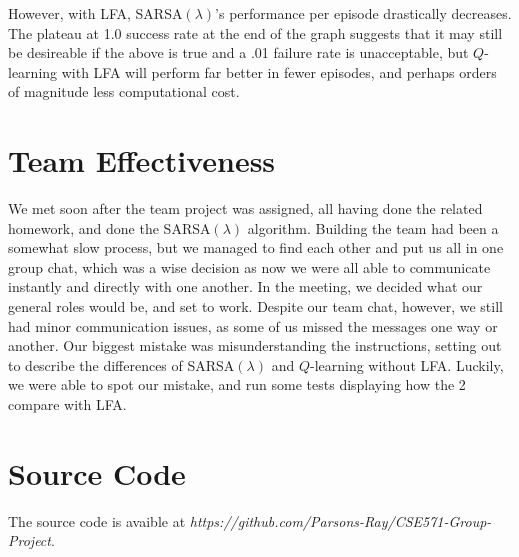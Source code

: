 \documentclass[10pt,conference]{IEEEtran}
\begin{document}
However, with LFA, SARSA\((\lambda)\)'s performance per episode drastically 
decreases. The plateau at 1.0 success rate at the end of the graph suggests that 
it may still be desireable if the above is true and a .01 failure rate is unacceptable, 
but \(Q\)-learning with LFA will perform far better in fewer episodes, and perhaps orders of magnitude less computational cost.


\section{Team Effectiveness}
\label{sec:team}
We met soon after the team project was assigned, all having done the 
related homework, and done the SARSA\((\lambda)\) algorithm. Building 
the team had been a somewhat slow process, but we managed to find each 
other and put us all in one group chat, which was a wise decision as 
now we were all able to communicate instantly and directly with one 
another. In the meeting, we decided what our general roles would be, 
and set to work. Despite our team chat, however, we still had minor
communication issues, as some of us missed the messages one way or 
another. Our biggest mistake was misunderstanding the instructions, 
setting out to describe the differences of SARSA\((\lambda)\) and 
\(Q\)-learning without LFA. Luckily, we were able to spot our mistake, 
and run some tests displaying how the 2 compare with LFA.


\section{Source Code}
The source code is avaible at \textit{https://github.com/Parsons-Ray/CSE571-Group-Project}.



\end{document}
